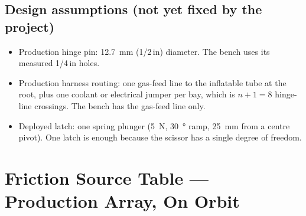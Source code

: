 \documentclass[11pt]{article}
\begin{document}
\subsection*{Design assumptions (not yet fixed by the project)}

\begin{itemize}[nosep]
    \item Production hinge pin: \SI{12.7}{mm} (1/2\,in) diameter. The bench uses its measured 1/4\,in holes.
    \item Production harness routing: one gas-feed line to the inflatable tube at the root, plus one
    coolant or electrical jumper per bay, which is $n+1=8$ hinge-line crossings. The bench has the gas-feed
    line only.
    \item Deployed latch: one spring plunger (\SI{5}{N}, \SI{30}{\degree} ramp, \SI{25}{mm} from a centre
    pivot). One latch is enough because the scissor has a single degree of freedom.
\end{itemize}

\section{Friction Source Table --- Production Array, On Orbit}
\label{sec:prod}
\end{document}
